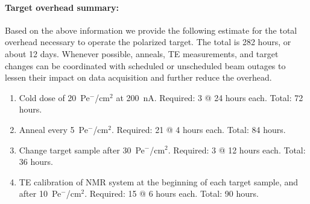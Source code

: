 \paragraph{Target overhead summary:}
Based on the above information we provide the following estimate for the total overhead necessary to operate the polarized target.  The total is 282 hours, or about 12 days.  Whenever possible, anneals, TE measurements, and target changes can be coordinated with scheduled or unscheduled beam outages to lessen their impact on data acquisition and further reduce the overhead.  
\begin{enumerate}
  \item{Cold dose of 20~Pe$^{\minus}$/cm$^2$ at 200~nA.  Required: 3 @ 24 hours each. 
    Total: 72 hours.}  
    \item{Anneal every 5~Pe$^{\minus}$/cm$^2$.  Required: 21 @ 4 hours each. 
      Total: 84 hours.}
      \item{Change target sample after 30~Pe$^{\minus}$/cm$^2$.  Required: 3 @ 12 hours each.  Total: 36 hours.}
        \item{TE calibration of NMR system at the beginning of each target sample, and after 
          10~Pe$^{\minus}$/cm$^2$.  Required: 15 @ 6 hours each.  
          Total: 90 hours}.
\end{enumerate}
